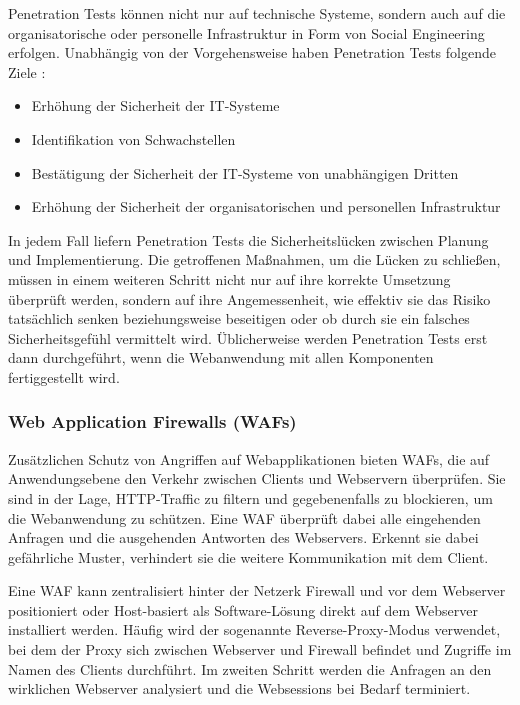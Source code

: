 \documentclass[12pt,oneside,a4paper,parskip,pointlessnumbers]{scrbook}
\begin{document}
    Penetration Tests können nicht nur auf technische Systeme, sondern auch auf die organisatorische oder
    personelle Infrastruktur in Form von Social Engineering erfolgen.
    Unabhängig von der Vorgehensweise haben Penetration Tests folgende Ziele \cite{BSI}:
    \begin{itemize}
      \item Erhöhung der Sicherheit der IT-Systeme
      \item Identifikation von Schwachstellen
      \item Bestätigung der Sicherheit der IT-Systeme von unabhängigen Dritten
      \item Erhöhung der Sicherheit der organisatorischen und personellen Infrastruktur
    \end{itemize}

    In jedem Fall liefern Penetration Tests die Sicherheitslücken zwischen Planung und Implementierung. Die
    getroffenen Maßnahmen, um die Lücken zu schließen, müssen in einem weiteren Schritt nicht nur auf ihre
    korrekte Umsetzung überprüft werden, sondern auf ihre Angemessenheit, wie effektiv sie das Risiko
    tatsächlich senken beziehungsweise beseitigen oder ob durch sie ein falsches Sicherheitsgefühl vermittelt
    wird. Üblicherweise werden Penetration Tests erst dann durchgeführt, wenn die Webanwendung mit allen
    Komponenten fertiggestellt wird. \cite{BSI}
    \subsubsection{Web Application Firewalls (WAFs)}
    Zusätzlichen Schutz von Angriffen auf Webapplikationen bieten WAFs, die auf Anwendungsebene den Verkehr zwischen Clients und Webservern überprüfen. Sie sind in der Lage, HTTP-Traffic zu filtern und gegebenenfalls zu blockieren, um die Webanwendung zu schützen.
    Eine WAF überprüft dabei alle eingehenden Anfragen und die ausgehenden Antworten des Webservers.
    Erkennt sie dabei gefährliche Muster, verhindert sie die weitere Kommunikation mit dem Client.

    Eine WAF kann zentralisiert hinter der Netzerk Firewall und vor dem Webserver positioniert oder Host-basiert als Software-Lösung direkt auf dem Webserver installiert werden.
    Häufig wird der sogenannte Reverse-Proxy-Modus verwendet, bei dem der Proxy sich zwischen Webserver und Firewall befindet und Zugriffe im Namen des Clients durchführt. Im zweiten Schritt werden die Anfragen an den wirklichen Webserver analysiert und die Websessions bei Bedarf terminiert.
\end{document}
